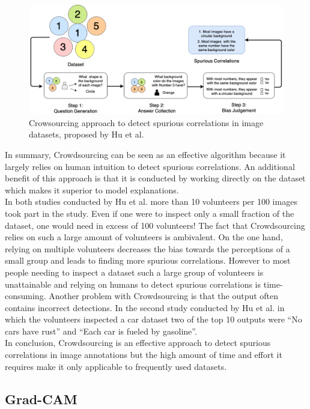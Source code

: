 \documentclass{article}
\begin{document}
\begin{figure}
    \centering
    \includegraphics[scale=0.315]{crowdsourcing.png}
    \caption{Crowsourcing approach to detect spurious correlations in image datasets, proposed by Hu et al. \cite{10.1145/3366423.3380063}}
    \label{fig:crowdsourcing}
\end{figure}
In summary, Crowdsourcing can be seen as an effective algorithm because it largely relies on human intuition to detect spurious correlations. An additional benefit of this approach is that it is conducted by working directly on the dataset which makes it superior to model explanations. \\
In both studies conducted by Hu et al. more than 10 volunteers per 100 images took part in the study. Even if one were to inspect only a small fraction of the dataset, one would need in excess of 100 volunteers! The fact that Crowdsourcing relies on such a large amount of volunteers is ambivalent. On the one hand, relying on multiple volunteers decreases the bias towards the perceptions of a small group and leads to finding more spurious correlations. However to most people needing to inspect a dataset such a large group of volunteers is unattainable and relying on humans to detect spurious correlations is time-consuming. Another problem with Crowdsourcing is that the output often contains incorrect detections. In the second study conducted by Hu et al. in which the volunteers inspected a car dataset two of the top 10 outputs were \enquote{No cars have rust} and \enquote{Each car is fueled by gasoline}. \\
In conclusion, Crowdsourcing is an effective approach to detect spurious correlations in image annotations but the high amount of time and effort it requires make it only applicable to frequently used datasets.
\subsection{Grad-CAM}
\end{document}
